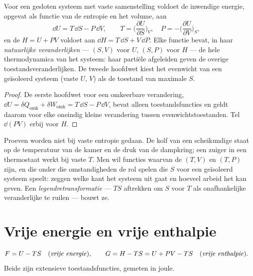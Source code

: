 \begin{proposition}[Grondidentiteit]\label{prop:b2:thermodynamic-potentials:identity}
Voor een gesloten systeem met vaste samenstelling voldoet de inwendige energie,
opgevat als functie van de entropie en het volume, aan
\[
\dd U = T\,\dd S - P\,\dd V, \qquad
T = \Big(\frac{\partial U}{\partial S}\Big)_V, \quad
P = -\Big(\frac{\partial U}{\partial V}\Big)_S ,
\]
en de  $H = U + PV$ voldoet aan $\dd H = T\,\dd S + V\,\dd P$.
Elke functie bevat, in haar \emph{natuurlijke veranderlijken} --- $(S,V)$ voor $U$, $(S,P)$ voor $H$ --- de hele
thermodynamica van het systeem: haar partiële afgeleiden geven de overige
toestandsveranderlijken. De tweede hoofdwet kiest het evenwicht van een geïsoleerd
systeem (vaste $U$, $V$) als de toestand van maximale $S$.
\end{proposition}

\begin{proof}
De eerste hoofdwet voor een omkeerbare verandering,
$\dd U = \delta Q_{\text{omk}}
+ \delta W_{\text{omk}} = T\,\dd S - P\,\dd V$,
bevat alleen toestands\-functies
en geldt daarom voor elke oneindig kleine verandering tussen
evenwichtstoestanden. Tel $\dd(PV)$ erbij voor $H$.
\end{proof}

\begin{remark}\label{rem:b2:thermodynamic-potentials:why}
Proeven worden niet bij vaste entropie gedaan. De kolf van een scheikundige staat op
de temperatuur van de kamer en de druk van de dampkring; een
zuiger in een thermostaat werkt bij vaste $T$. Men wil functies waarvan de
 $(T,V)$ en $(T,P)$ zijn, en die onder die
omstandigheden de rol spelen die $S$ voor een geïsoleerd systeem speelt: zeggen
welke kant het systeem uit gaat en hoeveel arbeid het kan geven. Een
\emph{legendretransformatie} --- $TS$ aftrekken om $S$ voor $T$ als
onafhankelijke veranderlijke te ruilen --- bouwt ze.
\end{remark}

\section{Vrije energie en vrije enthalpie}

\begin{definition}\label{def:b2:thermodynamic-potentials:FG}
\[
F = U - TS \quad\text{(\emph{vrije energie}\index{vrije energie})}, \qquad
G = H - TS = U + PV - TS \quad\text{(\emph{vrije enthalpie}\index{vrije
enthalpie})}.
\]
Beide zijn extensieve toestandsfuncties, gemeten in joule.
\end{definition}

